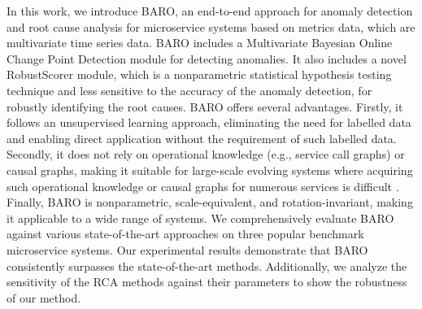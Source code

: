 








In this work, we introduce BARO, an end-to-end approach for anomaly detection and root cause analysis for microservice systems based on metrics data, which are multivariate time series data. BARO includes a Multivariate Bayesian Online Change Point Detection module for detecting anomalies. It also includes a novel RobustScorer module, which is a nonparametric statistical hypothesis testing technique and less sensitive to the accuracy of the anomaly detection, for robustly identifying the root causes. BARO offers several advantages. Firstly, it follows an unsupervised learning approach, eliminating the need for labelled data and enabling direct application without the requirement of such labelled data. Secondly, it does not rely on operational knowledge (e.g., service call graphs) or causal graphs, making it suitable for large-scale evolving systems where acquiring such operational knowledge or causal graphs for numerous services is difficult \cite{Azam2022rcd, Li2022Circa, Wang2018cloudranger}. Finally, BARO is nonparametric, scale-equivalent, and rotation-invariant, making it applicable to a wide range of systems. We comprehensively evaluate BARO against various state-of-the-art approaches on three popular benchmark microservice systems. Our experimental results demonstrate that BARO consistently surpasses the state-of-the-art methods. Additionally, we analyze the sensitivity of the RCA methods against their parameters to show the robustness of our method.

